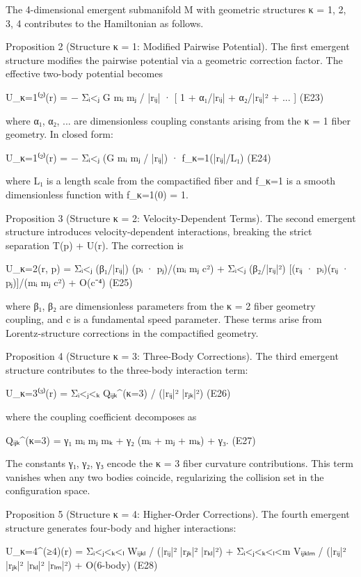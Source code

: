 The 4-dimensional emergent submanifold M with geometric structures
κ = 1, 2, 3, 4 contributes to the Hamiltonian as follows.


Proposition 2 (Structure κ = 1: Modified Pairwise Potential).
The first emergent structure modifies the pairwise potential via a geometric
correction factor. The effective two-body potential becomes

    U_{κ=1}⁽²⁾(r) = − Σᵢ<ⱼ  G mᵢ mⱼ / |rᵢⱼ|  ·  [ 1 + α₁/|rᵢⱼ| + α₂/|rᵢⱼ|² + ... ]    (E23)

where α₁, α₂, ... are dimensionless coupling constants arising from the
κ = 1 fiber geometry. In closed form:

    U_{κ=1}⁽²⁾(r) = − Σᵢ<ⱼ  (G mᵢ mⱼ / |rᵢⱼ|) · f_{κ=1}(|rᵢⱼ|/L₁)    (E24)

where L₁ is a length scale from the compactified fiber and f_{κ=1} is a
smooth dimensionless function with f_{κ=1}(0) = 1.


Proposition 3 (Structure κ = 2: Velocity-Dependent Terms).
The second emergent structure introduces velocity-dependent interactions,
breaking the strict separation T(p) + U(r). The correction is

    U_{κ=2}(r, p) = Σᵢ<ⱼ  (β₁/|rᵢⱼ|) (pᵢ · pⱼ)/(mᵢ mⱼ c²)
                  + Σᵢ<ⱼ  (β₂/|rᵢⱼ|²) [(rᵢⱼ · pᵢ)(rᵢⱼ · pⱼ)]/(mᵢ mⱼ c²)
                  + O(c⁻⁴)                                          (E25)

where β₁, β₂ are dimensionless parameters from the κ = 2 fiber geometry
coupling, and c is a fundamental speed parameter. These terms arise from
Lorentz-structure corrections in the compactified geometry.


Proposition 4 (Structure κ = 3: Three-Body Corrections).
The third emergent structure contributes to the three-body interaction term:

    U_{κ=3}⁽³⁾(r) = Σᵢ<ⱼ<ₖ  Qᵢⱼₖ^{(κ=3)} / (|rᵢⱼ|² |rⱼₖ|²)          (E26)

where the coupling coefficient decomposes as

    Qᵢⱼₖ^{(κ=3)} = γ₁ mᵢ mⱼ mₖ + γ₂ (mᵢ + mⱼ + mₖ) + γ₃.          (E27)

The constants γ₁, γ₂, γ₃ encode the κ = 3 fiber curvature contributions.
This term vanishes when any two bodies coincide, regularizing the collision
set in the configuration space.


Proposition 5 (Structure κ = 4: Higher-Order Corrections).
The fourth emergent structure generates four-body and higher interactions:

    U_{κ=4}^{(≥4)}(r) = Σᵢ<ⱼ<ₖ<ₗ  Wᵢⱼₖₗ / (|rᵢⱼ|² |rⱼₖ|² |rₖₗ|²)
                        + Σᵢ<ⱼ<ₖ<ₗ<m  Vᵢⱼₖₗₘ / (|rᵢⱼ|² |rⱼₖ|² |rₖₗ|² |rₗₘ|²)
                        + O(6-body)                                (E28)

